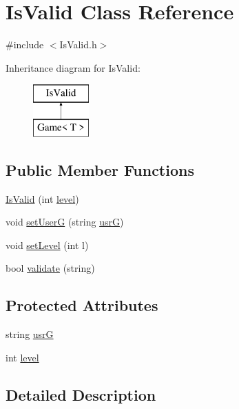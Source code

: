 \hypertarget{class_is_valid}{}\section{Is\+Valid Class Reference}
\label{class_is_valid}


{\ttfamily \#include $<$Is\+Valid.\+h$>$}

Inheritance diagram for Is\+Valid\+:\begin{figure}[H]
\begin{center}
\leavevmode
\includegraphics[height=2.000000cm]{class_is_valid}
\end{center}
\end{figure}
\subsection*{Public Member Functions}
\begin{DoxyCompactItemize}
\item 
\hyperlink{class_is_valid_ad8de07083cbd328b8643445583140ed1}{Is\+Valid} (int \hyperlink{class_is_valid_ad803e4f443a19d48af63effafc3ae527}{level})
\item 
void \hyperlink{class_is_valid_a9b09b29e31ae25d4beb6821e699c11ce}{set\+User\+G} (string \hyperlink{class_is_valid_adbf865b1f62a0967106b899e15bbc6cb}{usr\+G})
\item 
void \hyperlink{class_is_valid_ad666e24d961a3502e76769cbe4194158}{set\+Level} (int l)
\item 
bool \hyperlink{class_is_valid_aa658b1bd8bb71b55e62249047e39e938}{validate} (string)
\end{DoxyCompactItemize}
\subsection*{Protected Attributes}
\begin{DoxyCompactItemize}
\item 
string \hyperlink{class_is_valid_adbf865b1f62a0967106b899e15bbc6cb}{usr\+G}
\item 
int \hyperlink{class_is_valid_ad803e4f443a19d48af63effafc3ae527}{level}
\end{DoxyCompactItemize}


\subsection{Detailed Description}


